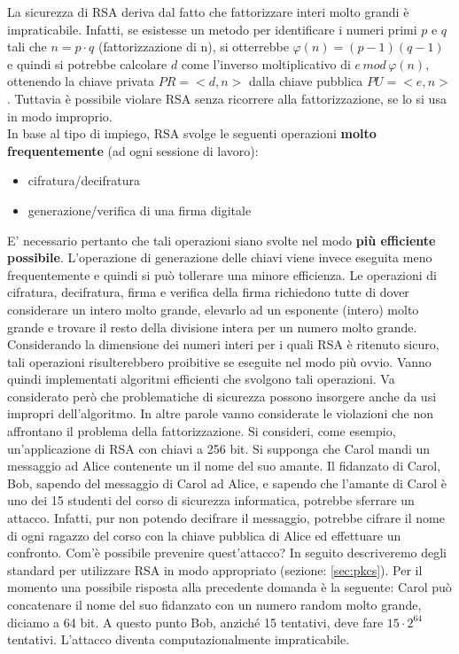 La sicurezza di RSA deriva dal fatto che fattorizzare interi molto grandi è impraticabile. Infatti, se esistesse un metodo per identificare i numeri primi $p$ e $q$ tali che $n = p \cdot q$ (fattorizzazione di n), si otterrebbe $\varphi(n) = (p-1)(q-1)$ e quindi si potrebbe calcolare $d$ come l'inverso moltiplicativo di $e \, mod \, \varphi(n)$, ottenendo la chiave privata $PR = <d,n>$ dalla chiave pubblica $PU = <e,n>$. 
\newline \newline
Tuttavia è possibile violare RSA senza ricorrere alla fattorizzazione, se lo si usa in modo improprio. \\
In base al tipo di impiego, RSA svolge le seguenti operazioni\textbf{ molto frequentemente} (ad ogni sessione di lavoro): 
\begin{itemize}
\item cifratura/decifratura
\item generazione/verifica di una firma digitale
\end{itemize}
E' necessario pertanto che tali operazioni siano svolte nel modo \textbf{più efficiente possibile}. L'operazione di generazione delle chiavi viene invece eseguita meno frequentemente e quindi si può tollerare una minore efficienza.
\newline \newline
Le operazioni di cifratura, decifratura, firma e verifica della firma richiedono tutte di dover considerare un intero molto grande, elevarlo ad un esponente (intero) molto grande e trovare il resto della divisione intera per un numero molto grande. Considerando la dimensione dei numeri interi per i quali RSA è ritenuto sicuro, tali operazioni risulterebbero proibitive se eseguite nel modo più ovvio. Vanno quindi implementati algoritmi efficienti che svolgono tali operazioni.
\newline \newline
Va considerato però che problematiche di sicurezza possono insorgere anche da usi impropri dell'algoritmo. In altre parole vanno considerate le violazioni che non affrontano il problema della fattorizzazione. Si consideri, come esempio, un'applicazione di RSA con chiavi a 256 bit.
\newline \newline
Si supponga che Carol mandi un messaggio ad Alice contenente un il nome del suo amante. Il fidanzato di Carol, Bob, sapendo del messaggio di Carol ad Alice, e sapendo che l'amante di Carol è uno dei 15 studenti del corso di sicurezza informatica, potrebbe sferrare un attacco. Infatti, pur non potendo decifrare il messaggio, potrebbe cifrare il nome di ogni ragazzo del corso con la chiave pubblica di Alice ed effettuare un confronto.
\newline \newline
Com'è possibile prevenire quest'attacco? In seguito descriveremo degli standard per utilizzare RSA in modo appropriato (sezione: \ref{sec:pkcs}). Per il momento una possibile risposta alla precedente domanda è la seguente: Carol può concatenare il nome del suo fidanzato con un numero random molto grande, diciamo a 64 bit. A questo punto Bob, anziché 15 tentativi, deve fare $15 \cdot 2^{64}$ tentativi. L'attacco diventa computazionalmente impraticabile.

